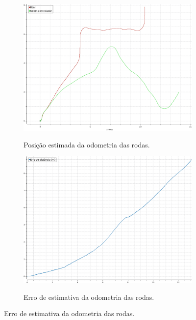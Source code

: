 \documentclass[repeatfields,xlists,xpacks,oneside,yearsonly]{ufrgscca}
\begin{document}
\begin{figure}[h]
    \caption{Resultado da odometria das rodas.}
    \label{fig:controller_odom_result}
    \begin{subfigure}{0.5\linewidth}
        {
            \centering
            \caption{Posição estimada da odometria das rodas.}
            \label{fig:odom_controller}
            \includegraphics[width=0.98\linewidth]{odom-controlador.png}\\
        }
    \end{subfigure}
    \begin{subfigure}{0.5\linewidth}
        {
            \centering
            \caption{Erro de estimativa da odometria das rodas.}
            \label{fig:odom_controller_error}
            \includegraphics[width=0.98\linewidth]{odom-controlador-error.png}\\
        }
    \end{subfigure}
\end{figure}
\end{document}
